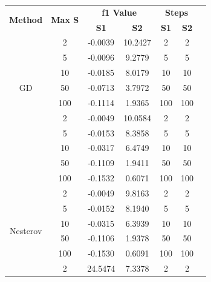 \documentclass[9pt]{IEEEtran}
\begin{document}
\begin{table}[h!]
    \centering
    \begin{tabular}{|c|c|c|c|c|c|c|}
        \hline
        \multirow{2}{*}{\textbf{Method}} & \multirow{2}{*}{\textbf{Max S}} & \multicolumn{2}{c|}{\textbf{f1 Value}} & \multicolumn{2}{c|}{\textbf{Steps}} \\ \cline{3-4} \cline{5-6}
                                          &                                  & \textbf{S1} & \textbf{S2} & \textbf{S1} & \textbf{S2} \\ \hline
        \multirow{7}{*}{GD}              & 2  & -0.0039  & 10.2427  & 2  & 2 \\ \cline{2-6} 
                                       & 5  & -0.0096  & 9.2779   & 5  & 5 \\ \cline{2-6} 
                                       & 10 & -0.0185  & 8.0179   & 10 & 10 \\ \cline{2-6} 
                                       & 50 & -0.0713  & 3.7972   & 50 & 50 \\ \cline{2-6} 
                                       & 100& -0.1114  & 1.9365   & 100 & 100 \\ \hline
        \multirow{7}{*}{Polyak}       & 2  & -0.0049  & 10.0584  & 2  & 2 \\ \cline{2-6} 
                                       & 5  & -0.0153  & 8.3858   & 5  & 5 \\ \cline{2-6} 
                                       & 10 & -0.0317  & 6.4749   & 10 & 10 \\ \cline{2-6} 
                                       & 50 & -0.1109  & 1.9411   & 50 & 50 \\ \cline{2-6} 
                                       & 100& -0.1532  & 0.6071   & 100 & 100 \\ \hline
        \multirow{7}{*}{Nesterov}     & 2  & -0.0049  & 9.8163   & 2  & 2 \\ \cline{2-6} 
                                       & 5  & -0.0152  & 8.1940   & 5  & 5 \\ \cline{2-6} 
                                       & 10 & -0.0315  & 6.3939   & 10 & 10 \\ \cline{2-6} 
                                       & 50 & -0.1106  & 1.9378   & 50 & 50 \\ \cline{2-6} 
                                       & 100& -0.1530  & 0.6091   & 100 & 100 \\ \hline
        \multirow{7}{*}{AdaGrad}         & 2  & 24.5474  & 7.3378   & 2  & 2 \\ \cline{2-6} 

\end{tabular}
\end{table}
\end{document}
